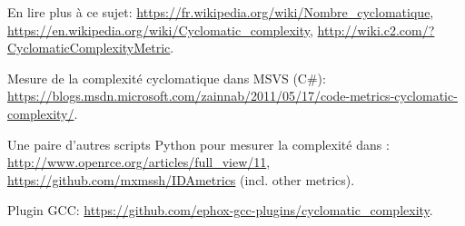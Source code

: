 En lire plus à ce sujet:
\url{https://fr.wikipedia.org/wiki/Nombre_cyclomatique},
\url{https://en.wikipedia.org/wiki/Cyclomatic_complexity},
\url{http://wiki.c2.com/?CyclomaticComplexityMetric}.

Mesure de la complexité cyclomatique dans MSVS (C\#):
\url{https://blogs.msdn.microsoft.com/zainnab/2011/05/17/code-metrics-cyclomatic-complexity/}.

Une paire d'autres scripts Python pour mesurer la complexité dans \IDA:
\url{http://www.openrce.org/articles/full_view/11},
\url{https://github.com/mxmssh/IDAmetrics} (incl. other metrics).

Plugin GCC:
\url{https://github.com/ephox-gcc-plugins/cyclomatic_complexity}.

